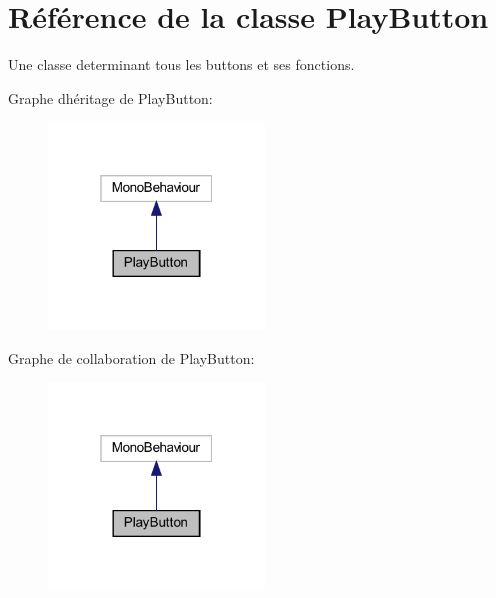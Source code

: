 \hypertarget{class_play_button}{}\section{Référence de la classe Play\+Button}
\label{class_play_button}


Une classe determinant tous les buttons et ses fonctions.  




Graphe d\textquotesingle{}héritage de Play\+Button\+:\nopagebreak
\begin{figure}[H]
\begin{center}
\leavevmode
\includegraphics[width=163pt]{class_play_button__inherit__graph}
\end{center}
\end{figure}


Graphe de collaboration de Play\+Button\+:\nopagebreak
\begin{figure}[H]
\begin{center}
\leavevmode
\includegraphics[width=163pt]{class_play_button__coll__graph}
\end{center}
\end{figure}

